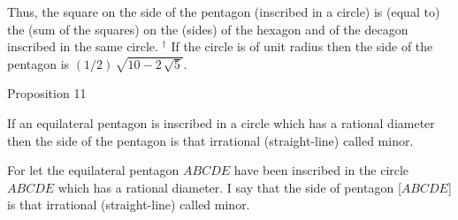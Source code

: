 Thus, the square on the side of the pentagon  (inscribed in a circle) is (equal to) the (sum of the squares)
on the (sides) of the hexagon and of  the decagon inscribed in the
same circle.
{\footnotesize\noindent$^\dag$ If the circle is of unit radius then the side
of the pentagon is $(1/2)\,\sqrt{10-2\,\sqrt{5}}$.}


\begin{center}
{\large Proposition 11}
\end{center}

If an equilateral pentagon is inscribed in a circle which has a rational  diameter  then the side of the pentagon is that irrational
(straight-line) called minor.

\epsfysize=2.5in
\centerline{}

For let the equilateral pentagon $ABCDE$ have been inscribed  in the circle $ABCDE$ which has a rational diameter. I say that the side of pentagon
[$ABCDE$] is that irrational (straight-line) called minor.

